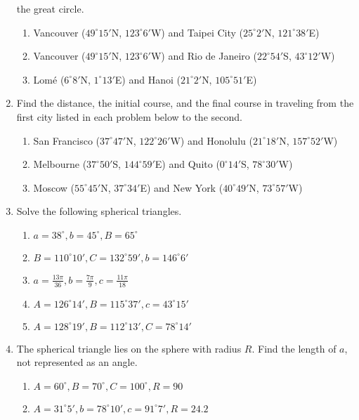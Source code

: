\documentclass[11pt]{article}
\begin{document}
\begin{enumerate}
  the great circle.
  \begin{enumerate}
  \item Vancouver ($49^{\circ}15'$N, $123^{\circ}6'$W) and Taipei City
    ($25^{\circ}2'$N, $121^{\circ}38'$E)
  \item Vancouver ($49^{\circ}15'$N, $123^{\circ}6'$W) and Rio de
    Janeiro ($22^{\circ}54'$S, $43^{\circ}12'$W)
  \item Lom{\'e} ($6^{\circ}8'$N, $1^{\circ}13'$E) and Hanoi
    ($21^{\circ}2'$N, $105^{\circ}51'$E)
  \end{enumerate}
\item Find the distance, the initial course, and the final course in
  traveling from the first city listed in each problem below to the
  second.
  \begin{enumerate}
  \item San Francisco ($37^{\circ}47'$N, $122^{\circ}26'$W) and
    Honolulu ($21^{\circ}18'$N, $157^{\circ}52'$W)
  \item Melbourne ($37^{\circ}50'$S, $144^{\circ}59'$E) and Quito
    ($0^{\circ}14'$S, $78^{\circ}30'$W)
  \item Moscow ($55^{\circ}45'$N, $37^{\circ}34'$E) and New York
    ($40^{\circ}49'$N, $73^{\circ}57'$W)
  \end{enumerate}
\item Solve the following spherical triangles.
  \begin{enumerate}
  \item $a=38^{\circ},b=45^{\circ},B=65^{\circ}$
  \item $B=110^{\circ}10',C=132^{\circ}59',b=146^{\circ}6'$
  \item $a=\frac{13\pi}{36},b=\frac{7\pi}{9},c=\frac{11\pi}{18}$
  \item $A=126^{\circ}14',B=115^{\circ}37',c=43^{\circ}15'$
  \item $A=128^{\circ}19',B=112^{\circ}13',C=78^{\circ}14'$
  \end{enumerate}
\item The spherical triangle lies on the sphere with radius $R$. Find
  the length of $a$, not represented as an angle.
  \begin{enumerate}
  \item $A=60^{\circ},B=70^{\circ},C=100^{\circ},R=90$
  \item $A=31^{\circ}5',b=78^{\circ}10',c=91^{\circ}7',R=24.2$
  \end{enumerate}
\end{enumerate}
\end{document}
